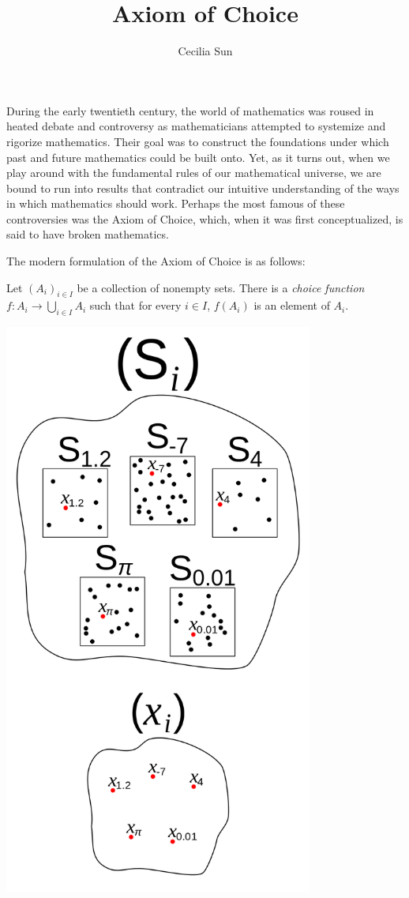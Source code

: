 \documentclass{article}
\title{Axiom of Choice}
\author{Cecilia Sun}
\begin{document}
\maketitle

During the early twentieth century, the world of mathematics was roused in heated debate and controversy as mathematicians attempted to systemize and rigorize mathematics. Their goal was to construct the foundations under which past and future mathematics could be built onto. Yet, as it turns out, when we play around with the fundamental rules of our mathematical universe, we are bound to run into results that contradict our intuitive understanding of the ways in which mathematics should work. Perhaps the most famous of these controversies was the Axiom of Choice, which, when it was first conceptualized, is said to have broken mathematics. 

The modern formulation of the Axiom of Choice is as follows:

Let $(A_i)_{i\in I}$ be a collection of nonempty sets. There is a \textit{choice function} $f:A_i\to \bigcup_{i\in I}A_i$ such that for every $i\in I$, $f(A_i)$ is an element of $A_i$.

\begin{center}
    \includegraphics[width=4in]{images/axiom_of_choice.wikipedia.png}
\end{center}
\end{document}
